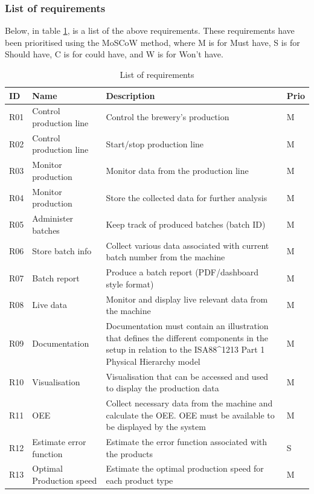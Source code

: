 \subsubsection{List of requirements}
Below, in table \ref{table:Requirements}, is a list of the above requirements. These requirements have been
prioritised using the MoSCoW method, where M is for Must have, S is for
Should have, C is for could have, and W is for Won't have. 

\begin{table}[H]
    \begin{tabularx}{\textwidth}{|>{\RaggedRight}p{1cm}|>{\RaggedRight}p{4cm}|>{\RaggedRight}X|>{\RaggedRight}p{1cm}|}
        \hline
        \textbf{ID} & \textbf{Name} & \textbf{Description} & \textbf{Prio} \\
        \hline
        R01 & Control production line & Control the brewery's production & M \\
        \hline
        R02 & Control production line & Start/stop production line & M \\
        \hline
        R03 & Monitor production & Monitor data from the production line & M \\
        \hline
        R04 & Monitor production & Store the collected data for further analysis & M \\
        \hline
        R05 & Administer batches & Keep track of produced batches (batch ID) & M \\
        \hline
        R06 & Store batch info & Collect various data associated with current batch number from the machine & M \\
        \hline
        R07 & Batch report & Produce a batch report (PDF/dashboard style format) & M \\
        \hline
        R08 & Live data & Monitor and display live relevant data from the machine & M \\
        \hline
        R09 & Documentation & Documentation must contain an illustration that defines the different components in the setup in relation to the ISA88\^{}1213 Part 1 Physical Hierarchy model & M \\
        \hline
        R10 & Visualisation & Visualisation that can be accessed and used to display the production data & M \\
        \hline
        R11 & OEE & Collect necessary data from the machine and calculate the OEE. OEE must be available to be displayed by the system & M \\
        \hline
        R12 & Estimate error function & Estimate the error function associated with the products & S \\
        \hline
        R13 & Optimal Production speed & Estimate the optimal production speed for each product type & M \\
        \hline
    \end{tabularx}
    \caption{List of requirements} 
    \label{table:Requirements}
\end{table}

